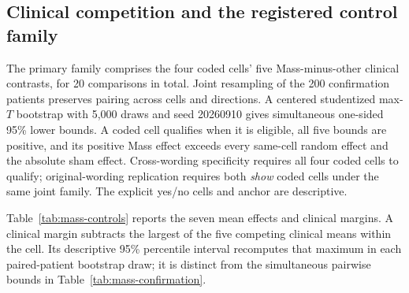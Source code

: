 \subsection{Clinical competition and the registered control family}

The primary family comprises the four coded cells' five Mass-minus-other
clinical contrasts, for 20 comparisons in total. Joint resampling of the
200 confirmation patients preserves pairing across cells and directions.
A centered studentized max-$T$ bootstrap with 5,000 draws and seed 20260910
gives simultaneous one-sided 95\% lower bounds. A coded cell qualifies when
it is eligible, all five bounds are positive, and its positive Mass effect
exceeds every same-cell random effect and the absolute sham effect.
Cross-wording specificity requires all four coded cells to qualify;
original-wording replication requires both \textit{show} coded cells under
the same joint family. The explicit yes/no cells and anchor are descriptive.

Table~\ref{tab:mass-controls} reports the seven mean effects and clinical
margins. A clinical margin subtracts the largest of the five competing
clinical means within the cell. Its descriptive 95\% percentile interval
recomputes that maximum in each paired-patient bootstrap draw; it is
distinct from the simultaneous pairwise bounds in
Table~\ref{tab:mass-confirmation}.

\begin{table}[H]
\centering
\caption{Mass clinical and generic-control competition.}
\label{tab:mass-controls}
\end{table}

